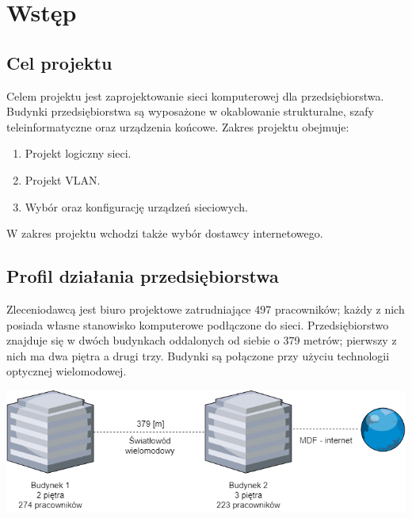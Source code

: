 \documentclass{article}
\begin{document}


\newpage
\section{Wstęp}
\subsection{Cel projektu}
\par Celem projektu jest zaprojektowanie sieci komputerowej dla przedsiębiorstwa. Budynki przedsiębiorstwa są wyposażone w okablowanie strukturalne, szafy teleinformatyczne oraz urządzenia końcowe. Zakres projektu obejmuje:
\begin{enumerate}
	\item Projekt logiczny sieci.
	\item Projekt VLAN.
	\item Wybór oraz konfigurację urządzeń sieciowych.
\end{enumerate}
\par W zakres projektu wchodzi także wybór dostawcy internetowego.

\subsection{Profil działania przedsiębiorstwa}
\par Zleceniodawcą jest biuro projektowe zatrudniające 497 pracowników; każdy z nich posiada własne stanowisko komputerowe podłączone do sieci. Przedsiębiorstwo znajduje się w dwóch budynkach oddalonych od siebie o 379 metrów; pierwszy z nich ma dwa piętra a drugi trzy. Budynki są połączone przy użyciu technologii optycznej wielomodowej.
\begin{center}
	\includegraphics[scale=0.55, center]{buildings_b}
\end{center}
\end{document}
